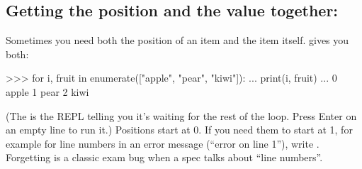 \documentclass[10pt,a4paper]{article}
\begin{document}
\subsection{Getting the position and the value together: }
Sometimes you need both the position of an item and the item itself.  gives you both:
\begin{txtcode}
>>> for i, fruit in enumerate(["apple", "pear", "kiwi"]):
...     print(i, fruit)
...
0 apple
1 pear
2 kiwi
\end{txtcode}
(The  is the REPL telling you it’s waiting for the rest of the loop. Press Enter on an empty line to run it.)
Positions start at 0. If you need them to start at 1, for example for line numbers in an error message (“error on line 1”), write . Forgetting  is a classic exam bug when a spec talks about “line numbers”.
\end{document}
